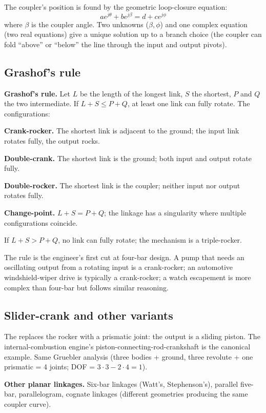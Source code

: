 The coupler's position is found by the geometric loop-closure equation:
\[
a e^{j\theta} + b e^{j\beta} = d + c e^{j\phi}
\]
where $\beta$ is the coupler angle. Two unknowns ($\beta, \phi$) and one complex equation (two real equations) give a unique solution up to a branch choice (the coupler can fold ``above'' or ``below'' the line through the input and output pivots).

\subsection{Grashof's rule}

\textbf{Grashof's rule.} Let $L$ be the length of the longest link, $S$ the shortest, $P$ and $Q$ the two intermediate. If $L + S \leq P + Q$, at least one link can fully rotate. The configurations:

\textbf{Crank-rocker.} The shortest link is adjacent to the ground; the input link rotates fully, the output rocks.

\textbf{Double-crank.} The shortest link is the ground; both input and output rotate fully.

\textbf{Double-rocker.} The shortest link is the coupler; neither input nor output rotates fully.

\textbf{Change-point.} $L + S = P + Q$; the linkage has a singularity where multiple configurations coincide.

If $L + S > P + Q$, no link can fully rotate; the mechanism is a triple-rocker.

The rule is the engineer's first cut at four-bar design. A pump that needs an oscillating output from a rotating input is a crank-rocker; an automotive windshield-wiper drive is typically a crank-rocker; a watch escapement is more complex than four-bar but follows similar reasoning.

\subsection{Slider-crank and other variants}

The  replaces the rocker with a prismatic joint: the output is a sliding piston. The internal-combustion engine's piston-connecting-rod-crankshaft is the canonical example. Same Gruebler analysis (three bodies + ground, three revolute + one prismatic = 4 joints; DOF = $3 \cdot 3 - 2 \cdot 4 = 1$).

\textbf{Other planar linkages.} Six-bar linkages (Watt's, Stephenson's), parallel five-bar, parallelogram, cognate linkages (different geometries producing the same coupler curve).

